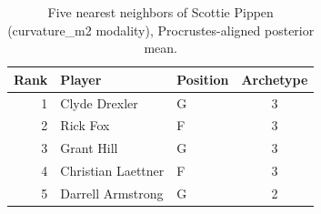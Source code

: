 \begin{table}[htbp]
  \centering\small
  \begin{tabular}{rllc}
    \toprule
    Rank & Player & Position & Archetype \\
    \midrule
    1 & Clyde Drexler & G & 3 \\
    2 & Rick Fox & F & 3 \\
    3 & Grant Hill & G & 3 \\
    4 & Christian Laettner & F & 3 \\
    5 & Darrell Armstrong & G & 2 \\
    \bottomrule
  \end{tabular}
  \caption{Five nearest neighbors of Scottie Pippen (curvature_m2 modality), Procrustes-aligned posterior mean.}
  \label{tab:Scottie_Pippen_neighbors_curvature_m2}
\end{table}

